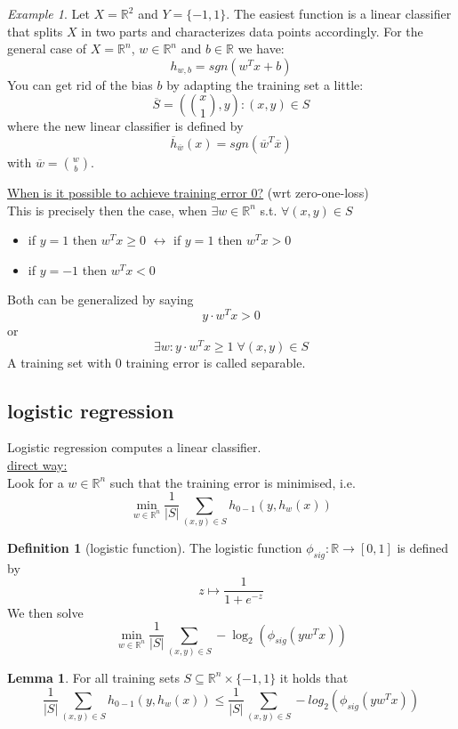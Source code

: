 \documentclass[a4paper, 12pt]{article}
\theoremstyle{plain}
\theoremstyle{definition}
\newtheorem{definition}[theorem]{Definition} %
\theoremstyle{lemma}
\newtheorem{lemma}[theorem]{Lemma}
\theoremstyle{remark}
\theoremstyle{example}
\newtheorem{example}[theorem]{Example}
\begin{document}
	\begin{example}
		Let $X = \mathbb{R}^2$ and $Y = \{-1,1\}$. The easiest function is a linear classifier that splits $X$ in two parts and characterizes data points accordingly. For the general case of $X = \mathbb{R}^n$, $w \in \mathbb{R}^n$ and $b \in \mathbb{R}$ we have:
		\[h_{w,b} = sgn(w^Tx + b)\] 
		You can get rid of the bias $b$ by adapting the training set a little: \[\overline{S} = (\binom{x}{1},y): (x,y) \in S\]
		where the new linear classifier is defined by \[\overline{h}_{\overline{w}}(x) = sgn(\overline{w}^T\overline{x})\] with $\overline{w} = \binom{w}{b}$.
	\end{example}
	\noindent\underline{When is it possible to achieve training error 0?} (wrt zero-one-loss)\\
	This is precisely then the case, when $\exists w \in \mathbb{R}^n$ s.t. $\forall (x,y) \in S$ \begin{itemize}
		\item if $y = 1$ then $w^Tx \geq 0$ $\leftrightarrow$ if $y = 1$ then $w^Tx > 0$
		\item if $y = -1$ then $w^Tx < 0$
	\end{itemize} 
	Both can be generalized by saying \[y\cdot w^Tx > 0\]
	or \[\exists w: y \cdot w^Tx \geq 1 \; \forall (x,y) \in S\] 
	A training set with 0 training error is called separable.
	
	\subsection{logistic regression}
	Logistic regression computes a linear classifier.\\
	\underline{direct way:}\\
	Look for a $w \in \mathbb{R}^n$ such that the training error is minimised, i.e. \[\min\limits_{w \in \mathbb{R}^n} \frac{1}{\left|S\right|} \sum_{(x,y) \in S} h_{0-1}(y,h_w(x))\]
	
	\begin{definition}[logistic function]
		The logistic function $\phi_{sig}: \mathbb{R} \to [0,1]$ is defined by \[z \mapsto \frac{1}{1+e^{-z}}\]
		We then solve \[\min\limits_{w \in \mathbb{R}^n} \frac{1}{\left|S\right|} \sum_{(x,y) \in S} - \log_2(\phi_{sig}(yw^Tx))\]
	\end{definition}
	
	\begin{lemma}
		For all training sets $S \subseteq \mathbb{R}^n \times \{-1,1\}$ it holds that \[\frac{1}{\left|S\right|} \sum_{(x,y) \in S} h_{0-1}(y,h_w(x)) \leq \frac{1}{\left|S\right|} \sum_{(x,y) \in S} -log_2(\phi_{sig}(yw^Tx))\]
	\end{lemma}
	
\end{document}
